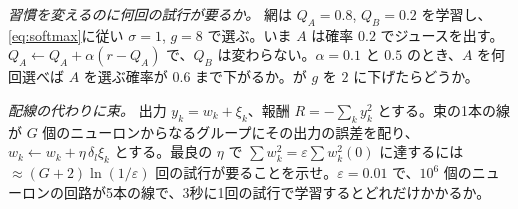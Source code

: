 \begin{exercise}[\lvlA]
\label{ex:10:6}
\emph{習慣を変えるのに何回の試行が要るか。} 網は $Q_A=0.8$, $Q_B=0.2$ を学習し、\eqref{eq:softmax}に従い $\sigma=1$, $g=8$ で選ぶ。いま $A$ は確率 $0.2$ でジュースを出す。$Q_A\leftarrow Q_A+\alpha(r-Q_A)$ で、$Q_B$ は変わらない。$\alpha=0.1$ と $0.5$ のとき、$A$ を何回選べば $A$ を選ぶ確率が $0.6$ まで下がるか。が $g$ を $2$ に下げたらどうか。
\end{exercise}

\begin{exercise}[\lvlC]
\label{ex:10:7}
\emph{配線の代わりに束。} 出力 $y_k=w_k+\xi_k$、報酬 $R=-\sum_ky_k^2$ とする。束の1本の線が $G$ 個のニューロンからなるグループにその出力の誤差を配り、$w_k\leftarrow w_k+\eta\,\delta_l\xi_k$ とする。最良の $\eta$ で $\sum w_k^2=\varepsilon\sum w_k^2(0)$ に達するには $\approx(G+2)\ln(1/\varepsilon)$ 回の試行が要ることを示せ。$\varepsilon=0.01$ で、$10^6$ 個のニューロンの回路が5本の線で、3秒に1回の試行で学習するとどれだけかかるか。
\end{exercise}
